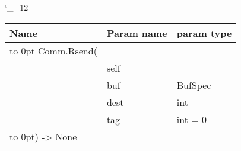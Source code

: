 \begingroup \catcode`\_=12 \tt
\begin{tabular}{lll}
\toprule
\textrm{Name}&\textrm{Param name}&\textrm{param type}\\
\midrule
\hbox to 0pt {Comm.Rsend(\hss}\\
& self\\
& buf & BufSpec\\
& dest & int\\
& tag & int = 0\\
\hbox to 0pt{) -> None\hss}\\
\bottomrule
\end{tabular}
\endgroup
